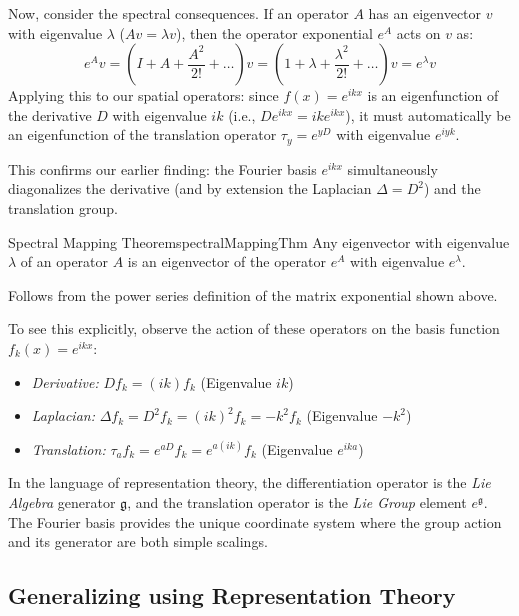 \documentclass{article}
\begin{document}
Now, consider the spectral consequences. If an operator $A$ has an eigenvector $v$ with eigenvalue $\lambda$
($Av = \lambda v$), then the operator exponential $e^A$ acts on $v$ as:
\[
e^A v = \left( I + A + \frac{A^2}{2!} + \dots \right) v = \left( 1 + \lambda + \frac{\lambda^2}{2!} + \dots \right) v = e^\lambda v
\]
Applying this to our spatial operators: since $f(x) = e^{ikx}$ is an eigenfunction of the derivative $D$
with eigenvalue $ik$ (i.e., $D e^{ikx} = ik e^{ikx}$), it must automatically be an eigenfunction of the
translation operator $\tau_y = e^{yD}$ with eigenvalue $e^{iyk}$.

This confirms our earlier finding: the Fourier basis $e^{ikx}$ simultaneously diagonalizes the derivative
(and by extension the Laplacian $\Delta = D^2$) and the translation group.

\begin{thm}{Spectral Mapping Theorem}{spectralMappingThm}
	Any eigenvector with eigenvalue $\lambda$ of an operator $A$ is an eigenvector of the operator $e^A$ with
	eigenvalue $e^\lambda$.
\end{thm}

\begin{Proof}
	Follows from the power series definition of the matrix exponential shown above.
\end{Proof}

To see this explicitly, observe the action of these operators on the basis function $f_k(x) = e^{ikx}$:
\begin{itemize}
	\item \emph{Derivative:} $D f_k = (ik) f_k$ \hfill (Eigenvalue $ik$)
	\item \emph{Laplacian:} $\Delta f_k = D^2 f_k = (ik)^2 f_k = -k^2 f_k$ \hfill (Eigenvalue $-k^2$)
	\item \emph{Translation:} $\tau_a f_k = e^{aD} f_k = e^{a(ik)} f_k$ \hfill (Eigenvalue $e^{ika}$)
\end{itemize}

In the language of representation theory, the differentiation operator is the \emph{Lie Algebra} generator
$\mathfrak{g}$, and the translation operator is the \emph{Lie Group} element $e^{\mathfrak{g}}$. The Fourier
basis provides the unique coordinate system where the group action and its generator are both simple scalings.

\subsection*{Generalizing using Representation Theory}
\end{document}
